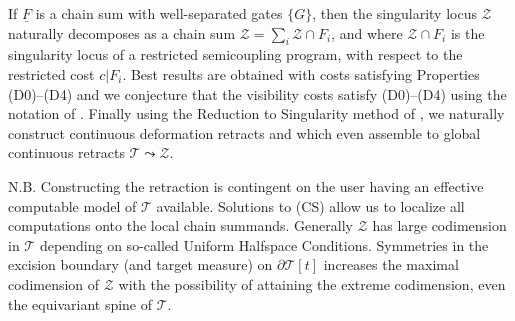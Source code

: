 \documentclass[12pt]{amsart}
\theoremstyle{definition}
\theoremstyle{remark}
\newcommand{\del}{\partial}
\newcommand{\uF}{\underline{F}}
\newcommand{\sT}{\mathscr{T}}
\newcommand{\sZ}{\mathscr{Z}}
\begin{document}


If $\uF$ is a chain sum with well-separated gates $\{G\}$, then the singularity locus $\sZ$ naturally decomposes as a chain sum $\sZ=\sum_i \sZ \cap F_i$, and where $\sZ \cap F_i$ is the singularity locus of a restricted semicoupling program, with respect to the restricted cost $c|F_i$. Best results are obtained with costs satisfying Properties (D0)--(D4) and we conjecture that the visibility costs satisfy (D0)--(D4) using the notation of \cite{martel}. Finally using the Reduction to Singularity method of \cite[Theorems 1.4.1-2]{martel}, we naturally construct continuous deformation retracts and which even assemble to global continuous retracts $\sT \leadsto \sZ$. 

N.B. Constructing the retraction is contingent on the user having an effective computable model of $\sT$ available. Solutions to (CS) allow us to localize all computations onto the local chain summands. Generally $\sZ$ has large codimension in $\sT$ depending on so-called Uniform Halfspace Conditions. Symmetries in the excision boundary (and target measure) on $\del \sT[t]$ increases the maximal codimension of $\sZ$ with the possibility of attaining the extreme codimension, even the equivariant spine of $\sT$. 
\end{document}
